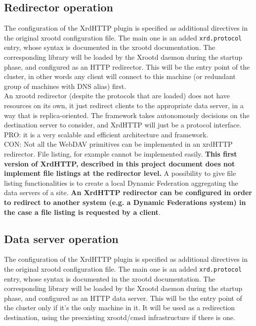 \documentclass[12pt]{article} %
\begin{document}
\subsection{Redirector operation}

The configuration of the XrdHTTP plugin is specified as additional directives in the original xrootd configuration file. The main one is an added \verb'xrd.protocol' entry, whose syntax is documented in the xrootd documentation.
The corresponding library will be loaded by the Xrootd daemon during the startup phase, and configured as an HTTP redirector. This will be the entry point of the cluster, in other words any client will connect to this machine (or redundant group of machines with DNS alias) first.\\

An xrootd redirector (despite the protocols that are loaded) does not have resources on its own, it just redirect clients to the appropriate data server, in a way that is replica-oriented. The framework takes autonomously decisions on the destination server to consider, and XrdHTTP will just be a protocol interface.\\

PRO: it is a very scalable and efficient architecture and framework.\\
CON: Not all the WebDAV primitives can be implemented in an xrdHTTP redirector. File listing, for example cannot be implemented easily. \textbf{This first version of XrdHTTP, described in this project document does not implement file listings at the redirector level.} A possibility to give file listing functionalities is to create a local Dynamic Federation aggregating the data servers of a site. \textbf{An XrdHTTP redirector can be configured in order to redirect to another system (e.g. a Dynamic Federations system) in the case a file listing is requested by a client}.\\





\subsection{Data server operation}
The configuration of the XrdHTTP plugin is specified as additional directives in the original xrootd configuration file. The main one is an added \verb'xrd.protocol' entry, whose syntax is documented in the xrootd documentation.
The corresponding library will be loaded by the Xrootd daemon during the startup phase, and configured as an HTTP data server. This will be the entry point of the cluster only if it's the only machine in it. It will be used as a redirection destination, using the preexisting xrootd/cmsd infrastructure if there is one.\\
\end{document}
